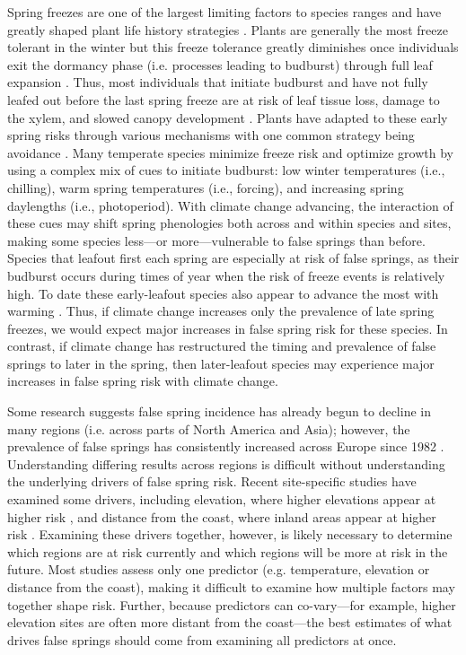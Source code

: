 \documentclass{article}\usepackage[]{graphicx}\usepackage[]{color}
\begin{document}
Spring freezes are one of the largest limiting factors to species ranges and have greatly shaped plant life history strategies \citep{Kollas2014}. Plants are generally the most freeze tolerant in the winter but this freeze tolerance greatly diminishes once individuals exit the dormancy phase (i.e. processes leading to budburst) through full leaf expansion \citep{Vitasse2014,Lenz2016}. Thus, most individuals that initiate budburst and have not fully leafed out before the last spring freeze are at risk of leaf tissue loss, damage to the xylem, and slowed canopy development \citep{Gu2008,Hufkens2012}. Plants have adapted to these early spring risks through various mechanisms with one common strategy being avoidance \citep{Vitasse2014}. Many temperate species minimize freeze risk and optimize growth by using a complex mix of cues to initiate budburst: low winter temperatures (i.e., chilling), warm spring temperatures (i.e., forcing), and increasing spring daylengths (i.e., photoperiod). With climate change advancing, the interaction of these cues may shift spring phenologies both across and within species and sites, making some species less---or more---vulnerable to false springs than before. Species that leafout first each spring are especially at risk of false springs, as their budburst occurs during times of year when the risk of freeze events is relatively high. To date these early-leafout species also appear to advance the most with warming  \citep{Wolkovich2012}. Thus, if climate change increases only the prevalence of late spring freezes, we would expect major increases in false spring risk for these species. In contrast, if climate change has restructured the timing and prevalence of false springs to later in the spring, then later-leafout species may experience major increases in false spring risk with climate change. 

Some research suggests false spring incidence has already begun to decline in many regions (i.e. across parts of North America and Asia); however, the prevalence of false springs has consistently increased across Europe since 1982 \citep{Liu2018}. Understanding differing results across regions is difficult without understanding the underlying drivers of false spring risk. Recent site-specific studies have examined some drivers, including elevation, where higher elevations appear at higher risk \citep{ Vitra2017,Ma2018, Vitasse2018}, and distance from the coast, where inland areas appear at higher risk \citep{Wypych2016a,Ma2018}. Examining these drivers together, however, is likely necessary to determine which regions are at risk currently and which regions will be more at risk in the future. Most studies assess only one predictor (e.g. temperature, elevation or distance from the coast), making it difficult to examine how multiple factors may together shape risk. Further, because predictors can co-vary---for example, higher elevation sites are often more distant from the coast---the best estimates of what drives false springs should come from examining all predictors at once. \\
\end{document}
